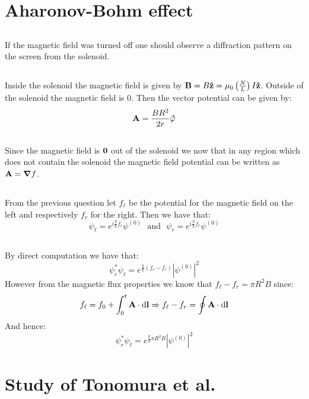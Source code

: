 \documentclass[10pt,a4paper]{book}
\begin{document}
\section{Aharonov-Bohm effect}
\subsection{}
If the magnetic field was turned off one should observe a diffraction pattern on the screen from the solenoid.

\subsection{}
Inside the solenoid the magnetic field is given by $\vb{B} = B\vu{z} = \mu_0\left(\frac{N}{L}\right)I \vu{z}$. Outside of the solenoid the magnetic field is 0. Then the vector potential can be given by:
\[
\vb{A} = \frac{B R^2}{2 r} \vu{\varphi}
\] 

\subsection{}
Since the magnetic field is $\vb{0}$ out of the solenoid we now that in any region which does not contain the solenoid the magnetic field potential can be written as $\vb{A} = \grad f$. 

\subsection{}
From the previous question let $f_\ell$ be the potential for the magnetic field on the left and respectively $f_r$ for the right. Then we have that:
\[
\psi_\ell = e^{i\frac{q}{\hbar} f_\ell} \psi^{(0)} \mbox{~~and~~} \psi_r = e^{i\frac{q}{\hbar} f_r} \psi^{(0)}
\]

\subsection{}
By direct computation we have that:
\[
\psi_r^* \psi_\ell = e^{\frac{q}{\hbar}(f_\ell - f_r)} |\psi^{(0)}|^2
\]
However from the magnetic flux properties we know that $f_\ell - f_r = \pi R^2 B$ since: 
\[
f_\ell = f_0 + \int_0^t \vb{A} \cdot \dd \vb{l} \Rightarrow f_\ell - f_r = \oint \vb{A} \cdot \dd \vb{l}
\]
And hence:
\[
\psi_r^* \psi_\ell = e^{\frac{q}{\hbar}\pi R^2 B} |\psi^{(0)}|^2
\]

\section{Study of Tonomura et al.}
\end{document}
